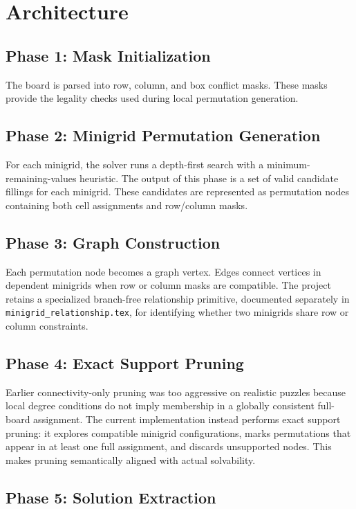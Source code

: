 \documentclass[11pt,a4paper]{article}
\begin{document}
\section{Architecture}

\subsection{Phase 1: Mask Initialization}

The board is parsed into row, column, and box conflict masks. These masks provide the legality checks used during local permutation generation.

\subsection{Phase 2: Minigrid Permutation Generation}

For each minigrid, the solver runs a depth-first search with a minimum-remaining-values heuristic. The output of this phase is a set of valid candidate fillings for each minigrid. These candidates are represented as permutation nodes containing both cell assignments and row/column masks.

\subsection{Phase 3: Graph Construction}

Each permutation node becomes a graph vertex. Edges connect vertices in dependent minigrids when row or column masks are compatible. The project retains a specialized branch-free relationship primitive, documented separately in \texttt{minigrid\_relationship.tex}, for identifying whether two minigrids share row or column constraints.

\subsection{Phase 4: Exact Support Pruning}

Earlier connectivity-only pruning was too aggressive on realistic puzzles because local degree conditions do not imply membership in a globally consistent full-board assignment. The current implementation instead performs exact support pruning: it explores compatible minigrid configurations, marks permutations that appear in at least one full assignment, and discards unsupported nodes. This makes pruning semantically aligned with actual solvability.

\subsection{Phase 5: Solution Extraction}
\end{document}
